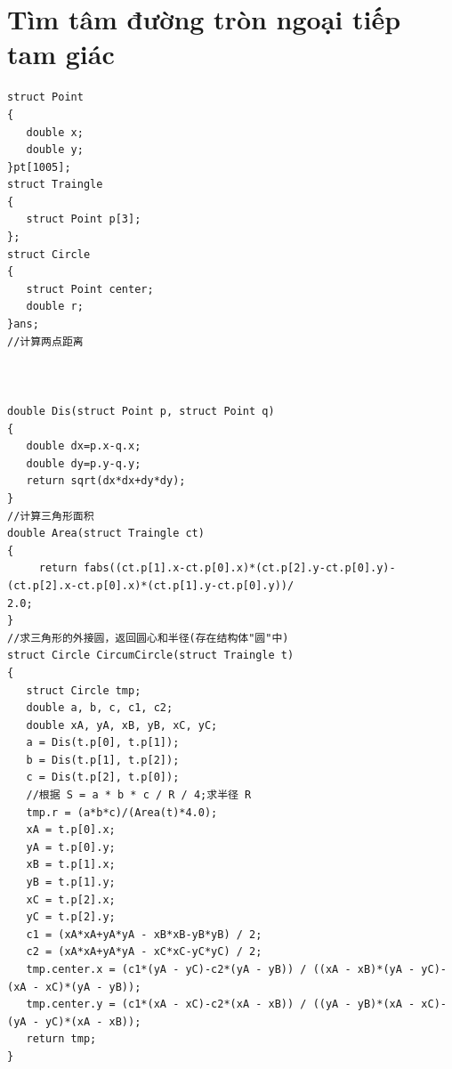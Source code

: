 \documentclass[11pt]{article}
\begin{document}
\section{Tìm tâm đường tròn ngoại tiếp tam giác}
\begingroup
\scriptsize
\begin{verbatim}
struct Point
{
   double x;
   double y;
}pt[1005];
struct Traingle
{
   struct Point p[3];
};
struct Circle
{
   struct Point center;
   double r;
}ans;
//计算两点距离



double Dis(struct Point p, struct Point q)
{
   double dx=p.x-q.x;
   double dy=p.y-q.y;
   return sqrt(dx*dx+dy*dy);
}
//计算三角形面积
double Area(struct Traingle ct)
{
     return fabs((ct.p[1].x-ct.p[0].x)*(ct.p[2].y-ct.p[0].y)-(ct.p[2].x-ct.p[0].x)*(ct.p[1].y-ct.p[0].y))/
2.0;
}
//求三角形的外接圆，返回圆心和半径(存在结构体"圆"中)
struct Circle CircumCircle(struct Traingle t)
{
   struct Circle tmp;
   double a, b, c, c1, c2;
   double xA, yA, xB, yB, xC, yC;
   a = Dis(t.p[0], t.p[1]);
   b = Dis(t.p[1], t.p[2]);
   c = Dis(t.p[2], t.p[0]);
   //根据 S = a * b * c / R / 4;求半径 R
   tmp.r = (a*b*c)/(Area(t)*4.0);
   xA = t.p[0].x;
   yA = t.p[0].y;
   xB = t.p[1].x;
   yB = t.p[1].y;
   xC = t.p[2].x;
   yC = t.p[2].y;
   c1 = (xA*xA+yA*yA - xB*xB-yB*yB) / 2;
   c2 = (xA*xA+yA*yA - xC*xC-yC*yC) / 2;
   tmp.center.x = (c1*(yA - yC)-c2*(yA - yB)) / ((xA - xB)*(yA - yC)-(xA - xC)*(yA - yB));
   tmp.center.y = (c1*(xA - xC)-c2*(xA - xB)) / ((yA - yB)*(xA - xC)-(yA - yC)*(xA - xB));
   return tmp;
}





\end{verbatim}
\endgroup
\end{document}
